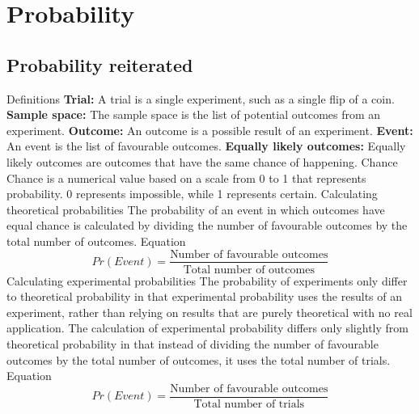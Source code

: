 \section{Probability}
\begin{outline}

\0
\subsection{Probability reiterated}
	\1 Definitions
		\2 \textbf{Trial: } A trial is a single experiment, such as a single flip of a coin.
		\2 \textbf{Sample space: } The sample space is the list of potential outcomes from an experiment.
		\2 \textbf{Outcome: } An outcome is a possible result of an experiment.
		\2 \textbf{Event: } An event is the list of favourable outcomes.
		\2 \textbf{Equally likely outcomes: } Equally likely outcomes are outcomes that have the same chance of happening.
	\1 Chance
		\2 Chance is a numerical value based on a scale from 0 to 1 that represents probability. 0 represents impossible, while 1 represents certain.
	\1 Calculating theoretical probabilities
		\2 The probability of an event in which outcomes have equal chance is calculated by dividing the number of favourable outcomes by the total number of outcomes.
			\3 Equation
				\[Pr(Event) = \frac{\text{Number of favourable outcomes}}{\text{Total number of outcomes}}\]
	\1 Calculating experimental probabilities
		\2 The probability of experiments only differ to theoretical probability in that experimental probability uses the results of an experiment, rather than relying on results that are purely theoretical with no real application. The calculation of experimental probability differs only slightly from theoretical probability in that instead of dividing the number of favourable outcomes by the total number of outcomes, it uses the total number of trials.
			\3 Equation
				\[Pr(Event) = \frac{\text{Number of favourable outcomes}}{\text{Total number of trials}}\]

\0

\end{outline}
